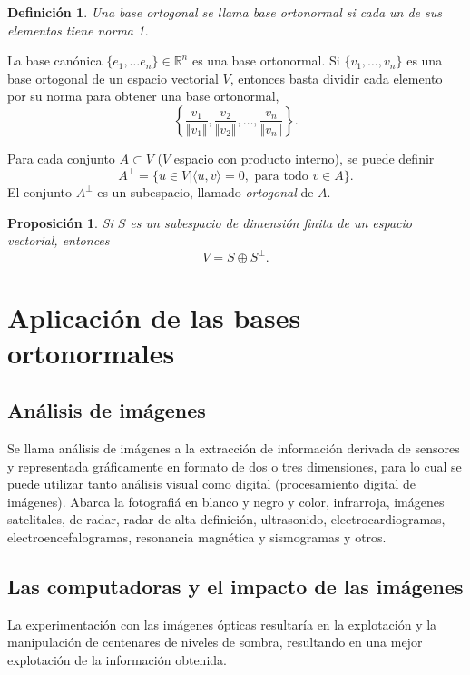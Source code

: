 \documentclass[b5paper, 11pt]{book}
\newcommand{\0}{\mathbf{0}}
\newcommand{\R}{\mathds{R}}
\theoremstyle{estiloB}
\theoremstyle{estiloC}
\newtheorem{unadefi}{Definición}[chapter]
\theoremstyle{estiloD}
\newtheorem{propo}{Proposición}[chapter]
\begin{document}
\begin{unadefi}
Una base ortogonal se llama \textit{base ortonormal} si cada un de sus elementos tiene norma 1. 
\end{unadefi}

La base canónica $\{ e_{1}, \ldots e_{n} \} \in \R^{n}$ es una base ortonormal. Si $\{ v_{1}, \ldots , v_{n} \}$ es una base ortogonal de un espacio vectorial $V$, entonces basta dividir cada elemento por su norma para obtener una base ortonormal,
\[
\left\{ \dfrac{v_{1}}{\Vert v_{1} \Vert}, \dfrac{v_{2}}{\Vert v_{2} \Vert}, \ldots , \dfrac{v_{n}}{\Vert v_{n} \Vert} \right\}.
\]

Para cada conjunto $A \subset V$ ($V$ espacio con producto interno), se puede definir
\[
A^{\perp}= \{ u \in  V | \langle u,v \rangle =0, \text{ para todo } v \in A \}.
\]
El conjunto $A^{\perp}$ es un subespacio, llamado \textit{ortogonal} de $A$.

\begin{propo}
Si $S$ es un subespacio de dimensión finita de un espacio vectorial, entonces
\[
V= S \oplus S^{\perp}.
\]
\end{propo}

\section{Aplicación de las bases ortonormales}

\subsection{Análisis de imágenes}
Se llama análisis de imágenes a la extracción de información derivada de sensores y representada gráficamente en formato de dos o tres dimensiones, para lo cual se puede utilizar tanto análisis visual como digital (procesamiento digital de imágenes). Abarca la fotografiá en blanco y negro y color, infrarroja, imágenes satelitales, de radar, radar de alta definición, ultrasonido, electrocardiogramas, electroencefalogramas, resonancia magnética y sismogramas y otros.

\subsection{Las computadoras y el impacto de las imágenes}
La experimentación con las imágenes ópticas resultaría en la explotación y la manipulación de centenares de niveles de sombra, resultando en una mejor explotación de la información obtenida.
\end{document}
